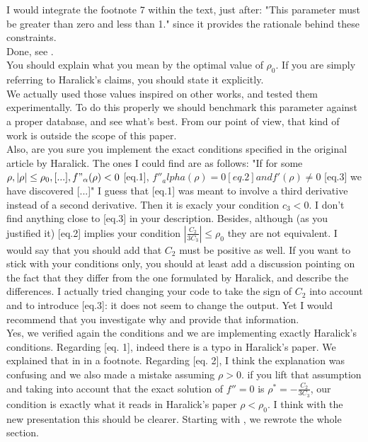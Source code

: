 \documentclass[a4paper,10pt]{report}
\begin{document}
\que I would integrate the footnote 7 within the text, just after: "This parameter
must be greater than zero and less
than 1." since it provides the rationale behind these constraints.\\

\ans Done, see .\\

\que You should explain what you mean by the optimal value of $\rho_0$. If you are
simply referring to Haralick's claims, you should state it explicitly.\\

\ans We actually used those values inspired on other works, and tested them experimentally. To do this properly we should benchmark this parameter against a proper database, and see what's best. From our point of view, that kind of work is outside the scope of this paper.\\

\que Also, are you sure you implement the exact conditions specified in the
original article by Haralick. The ones I could find are as follows:
"If for some $\rho, |\rho|\leq\rho_0, [...], f"_\alpha(\rho)<0$ [eq.1],
$f''_alpha(\rho)=0 [eq.2] and f'(\rho)\neq 0$ [eq.3] we have discovered [...]"
I guess that [eq.1] was meant to involve a third derivative instead of a second
derivative. Then it is exacly your condition $c_3<0$. I don't find anything
close to [eq.3] in your description. Besides, although (as you justified it)
[eq.2] implies your condition $|\frac{C_2}{3C_3}|\leq\rho_0$ they are not
equivalent. I would say that you should add that $C_2$ must be positive as well. If you want to stick with your conditions only, you should at least add a discussion pointing on the fact that they differ from the one formulated by Haralick, and
describe the differences. I actually tried changing your code to take the
sign of $C_2$ into account and to introduce [eq.3]: it does not seem to change
the output. Yet I would recommend that you investigate why and provide that
information.\\

\ans Yes, we verified again the conditions and we are implementing exactly Haralick's conditions. Regarding [eq. 1], indeed there is a typo in Haralick's paper. We explained that in  in a footnote.
Regarding [eq. 2], I think the explanation was confusing and we also made a mistake assuming $\rho>0$. if you lift that assumption and taking into account that the exact solution of $f''=0$ is $\rho^*=-\frac{C_2}{3C_3}$, our condition is exactly what it reads in Haralick's paper $\rho<\rho_0$. I think with the new presentation this should be clearer. Starting with , we rewrote the whole section.\\
\end{document}
